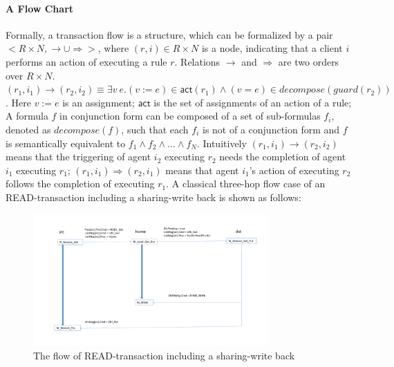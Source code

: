 \documentclass{llncs}
\begin{document}
\paragraph*{A Flow Chart} Formally, a transaction flow is a structure, which can be formalized by a pair $<R \times N, \rightarrow \cup \Rightarrow>$, where $(r,i) \in R \times N$ is a  node, indicating that a client $i$ performs an action of executing a rule $r$. Relations  $\rightarrow$  and $\Rightarrow$ are two   orders over $R \times N$. $(r_1,i_1) \rightarrow (r_2,i_2) \equiv \exists v~e. (v:=e) \in \mathsf{act}(r_1) \land (v=e) \in decompose(guard(r_2))$. Here $v:=e$ is an assignment; $\mathsf{act}$ is the set of assignments of an action of a rule; A formula $f$ in conjunction form can be composed of a set of sub-formulas $f_i$, denoted as $decompose(f)$, such that each $f_i$  is not of a conjunction form and $f$ is semantically equivalent to $f_1 \land f_2 \land ... \land f_N$. Intuitively $(r_1,i_1) \rightarrow (r_2,i_2)$ means that the triggering of agent $i_2$ executing $r_2$ needs the completion of agent $i_1$ executing $r_1$; $(r_1,i_1) \Rightarrow (r_2,i_1)$ means that agent $i_1$'s action of executing $r_2$ follows the completion of  executing $r_1$. A classical three-hop flow case of an READ-transaction including a sharing-write back is shown as follows:

\vspace{-20pt}
\begin{figure}[htbp]
\centering
\includegraphics[width=0.8\textwidth]{flow2.pdf}
\vspace{-20pt}
\caption{The flow of READ-transaction including a sharing-write back\label{fig:arch}}
\end{figure}
\vspace{-15pt}
\end{document}
